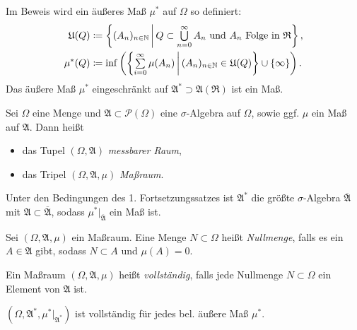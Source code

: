 \documentclass{cheat-sheet}
\newcommand{\Alg}{\mathfrak{A}} %
\newcommand{\Ring}{\mathfrak{R}} %
\begin{document}
\begin{bem}
  Im Beweis wird ein äußeres Maß $\mu^*$ auf $\Omega$ so definiert:
  \begin{align*}
    \mathfrak{U}(Q) &\coloneqq \left\{ (A_n)_{n \in \N} \,\middle|\, Q \subset \bigcup_{n = 0}^\infty A_n \text{ und } A_n \text{ Folge in } \Ring \right\}, \\
    \mu^*(Q) &\coloneqq \inf \left( \left\{ \sum_{i = 0}^\infty \mu(A_n) \,\middle|\, (A_n)_{n \in \N} \in \mathfrak{U}(Q) \right\} \cup \{ \infty \} \right).
  \end{align*}
  Das äußere Maß $\mu^*$ eingeschränkt auf $\Alg^* \supset \Alg(\Ring)$ ist ein Maß.
\end{bem}


\begin{defn}
  Sei $\Omega$ eine Menge und $\Alg \subset \mathcal{P}(\Omega)$ eine $\sigma$-Algebra auf $\Omega$, sowie ggf. $\mu$ ein Maß auf $\Alg$. Dann heißt
  \begin{itemize}
    \item das Tupel $(\Omega, \Alg)$ \emph{messbarer Raum},
    \item das Tripel $(\Omega, \Alg, \mu)$ \emph{Maßraum}.
  \end{itemize}
\end{defn}


\begin{satz}
  Unter den Bedingungen des 1. Fortsetzungssatzes ist $\Alg^*$ die größte $\sigma$-Algebra $\overline{\Alg}$ mit $\Alg \subset \overline{\Alg}$, sodass $\mu^*|_{\overline{\Alg}}$ ein Maß ist.
\end{satz}

\begin{defn}
  Sei $(\Omega, \Alg, \mu)$ ein Maßraum. Eine Menge $N \subset \Omega$ heißt \emph{Nullmenge}, falls es ein $A \in \Alg$ gibt, sodass $N \subset A$ und $\mu(A) = 0$.
\end{defn}

\begin{defn}
  Ein Maßraum $(\Omega, \Alg, \mu)$ heißt \emph{vollständig}, falls jede Nullmenge $N \subset \Omega$ ein Element von $\Alg$ ist.
\end{defn}

\begin{satz}
  $(\Omega, \Alg^*, \mu^*|_{\Alg^*})$ ist vollständig für jedes bel. äußere Maß $\mu^*$.
\end{satz}
\end{document}
